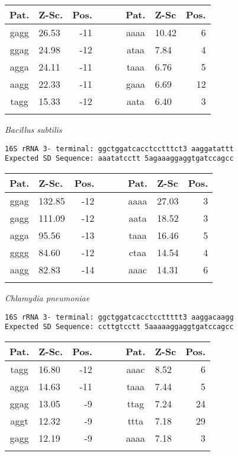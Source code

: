 \noindent
\begin{center}
\begin{tabular}{clrcclr}
Pat. & Z-Sc. & Pos. & \verb+   + & Pat. & Z-Sc & Pos. \\
\hline
gagg & 26.53 & -11 &  & aaaa & 10.42 & 6 \\
ggag & 24.98 & -12 &  & ataa & 7.84 & 4 \\
agga & 24.11 & -11 &  & taaa & 6.76 & 5 \\
aagg & 22.33 & -11 &  & gaaa & 6.69 & 12 \\
tagg & 15.33 & -12 &  & aata & 6.40 & 3 \\
    &     \\
\end{tabular}
\end{center}

\vspace{1em}
\noindent
{\it Bacillus subtilis    }
\begin{verbatim}
16S rRNA 3- terminal: ggctggatcacctcctttct3 aaggatattt
Expected SD Sequence: aaatatcctt 5agaaaggaggtgatccagcc
\end{verbatim}

\noindent
\begin{center}
\begin{tabular}{clrcclr}
Pat. & Z-Sc. & Pos. & \verb+   + & Pat. & Z-Sc & Pos. \\
\hline
ggag & 132.85 & -12 &  & aaaa & 27.03 & 3 \\
gagg & 111.09 & -12 &  & aata & 18.52 & 3 \\
agga & 95.56 & -13 &  & taaa & 16.46 & 5 \\
gggg & 84.60 & -12 &  & ctaa & 14.54 & 4 \\
aagg & 82.83 & -14 &  & aaac & 14.31 & 6 \\
    &     \\
\end{tabular}
\end{center}

\vspace{1em}
\noindent
{\it Chlamydia pneumoniae    }
\begin{verbatim}
16S rRNA 3- terminal: ggctggatcacctccttttt3 aaggacaagg
Expected SD Sequence: ccttgtcctt 5aaaaaggaggtgatccagcc
\end{verbatim}

\noindent
\begin{center}
\begin{tabular}{clrcclr}
Pat. & Z-Sc. & Pos. & \verb+   + & Pat. & Z-Sc & Pos. \\
\hline
tagg & 16.80 & -12 &  & aaac & 8.52 & 6 \\
agga & 14.63 & -11 &  & taaa & 7.44 & 5 \\
ggag & 13.05 & -9 &  & ttag & 7.24 & 24 \\
aggt & 12.32 & -9 &  & ttta & 7.18 & 29 \\
gagg & 12.19 & -9 &  & aaaa & 7.18 & 3 \\
    &     \\
\end{tabular}
\end{center}

